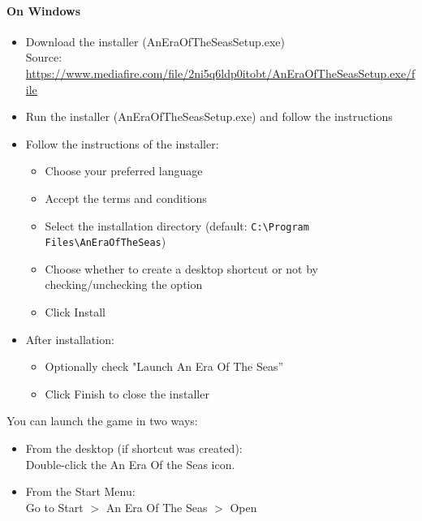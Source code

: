 \documentclass{article}
\begin{document}
\paragraph{On Windows}\hfill
\begin{itemize}
    \item Download the installer (AnEraOfTheSeasSetup.exe)\\Source: \url{https://www.mediafire.com/file/2ni5q6ldp0itobt/AnEraOfTheSeasSetup.exe/file}
    \item Run the installer (AnEraOfTheSeasSetup.exe) and follow the instructions
    \item Follow the instructions of the installer:
    \begin{itemize}
        \item Choose your preferred language
        \item Accept the terms and conditions
        \item Select the installation directory (default: \texttt{C:\textbackslash{}Program Files\textbackslash{}AnEraOfTheSeas})
        \item Choose whether to create a desktop shortcut or not by checking/unchecking the option
        \item Click Install
    \end{itemize}
    \item After installation:
    \begin{itemize}
        \item Optionally check "Launch An Era Of The Seas”
        \item Click Finish to close the installer
    \end{itemize}
\end{itemize}
You can launch the game in two ways:
\begin{itemize}
    \item From the desktop (if shortcut was created):\\Double-click the An Era Of the Seas icon.
    \item From the Start Menu:\\Go to Start $>$ An Era Of The Seas $>$ Open
\end{itemize}
\end{document}
